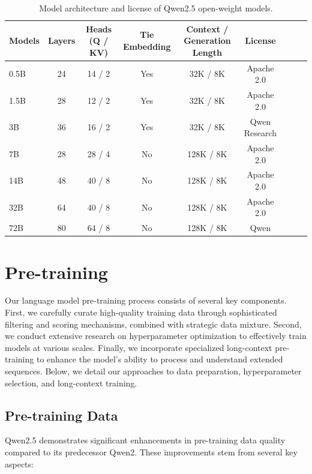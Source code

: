 \documentclass{article}
\begin{document}
\begin{table}[tbp]
\caption{Model architecture and license of Qwen2.5 open-weight models.}
\small
\centering
\begin{tabular}{@{}lcccccccc@{}} 
\toprule
Models  & Layers & Heads (Q / KV) & Tie Embedding & Context / Generation Length  & License \\
\midrule
0.5B  & 24 & 14 / 2 & Yes & 32K / 8K & Apache 2.0 \\
1.5B  & 28 & 12 / 2 & Yes & 32K / 8K & Apache 2.0 \\
3B  & 36 & 16 / 2 & Yes & 32K / 8K & Qwen Research \\
7B  & 28 & 28 / 4 & No & 128K / 8K & Apache 2.0 \\
14B & 48 & 40 / 8 & No & 128K / 8K & Apache 2.0 \\
32B & 64 & 40 / 8 & No & 128K / 8K & Apache 2.0 \\
72B  & 80 & 64 / 8 & No & 128K / 8K & Qwen \\
\bottomrule
\end{tabular}
\end{table}

\section{Pre-training}

Our language model pre-training process consists of several key components. First, we carefully curate high-quality training data through sophisticated filtering and scoring mechanisms, combined with strategic data mixture. Second, we conduct extensive research on hyperparameter optimization to effectively train models at various scales. Finally, we incorporate specialized long-context pre-training to enhance the model's ability to process and understand extended sequences. Below, we detail our approaches to data preparation, hyperparameter selection, and long-context training.

\label{sec:pre}

\subsection{Pre-training Data}

Qwen2.5 demonstrates significant enhancements in pre-training data quality compared to its predecessor Qwen2. These improvements stem from several key aspects:
\end{document}
